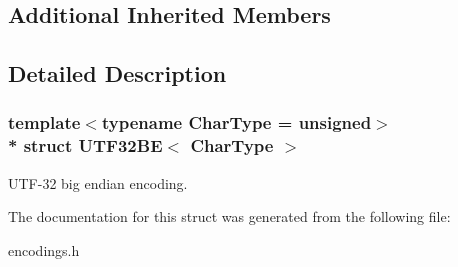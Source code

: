 \subsection*{Additional Inherited Members}


\subsection{Detailed Description}
\subsubsection*{template$<$typename Char\+Type = unsigned$>$\\*
struct U\+T\+F32\+B\+E$<$ Char\+Type $>$}

U\+T\+F-\/32 big endian encoding. 

The documentation for this struct was generated from the following file\+:\begin{DoxyCompactItemize}
\item 
encodings.\+h\end{DoxyCompactItemize}
